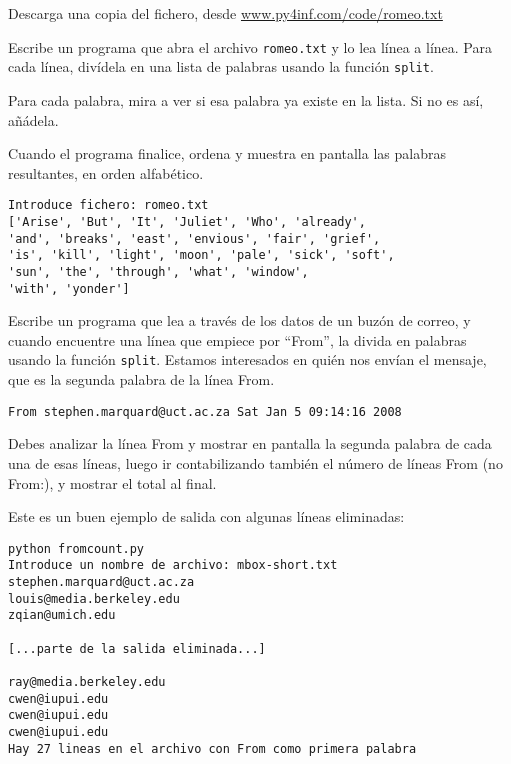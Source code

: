 \begin{ex}
Descarga una copia del fichero, desde
\url{www.py4inf.com/code/romeo.txt}

Escribe un programa que abra el archivo {\tt romeo.txt} y lo lea
línea a línea. Para cada línea, divídela en una lista de
palabras usando la función {\tt split}.

Para cada palabra, mira a ver si esa palabra ya existe en la lista.
Si no es así, añádela.

Cuando el programa finalice, ordena y muestra en pantalla las
palabras resultantes, en orden alfabético.

\begin{verbatim}
Introduce fichero: romeo.txt
['Arise', 'But', 'It', 'Juliet', 'Who', 'already', 
'and', 'breaks', 'east', 'envious', 'fair', 'grief', 
'is', 'kill', 'light', 'moon', 'pale', 'sick', 'soft', 
'sun', 'the', 'through', 'what', 'window', 
'with', 'yonder']
\end{verbatim}
\end{ex}

\begin{ex}
Escribe un programa que lea a través de los datos de un buzón de correo, y cuando
encuentre una línea que empiece por ``From'', la divida en
palabras usando la función {\tt split}. Estamos interesados en
quién nos envían el mensaje, que es la segunda palabra de la línea From.

{\tt From stephen.marquard@uct.ac.za Sat Jan  5 09:14:16 2008 }

Debes analizar la línea From y mostrar en pantalla la segunda palabra de
cada una de esas líneas, luego ir contabilizando también el número de líneas From
(no From:), y mostrar el total al final.

Este es un buen ejemplo de salida con algunas líneas eliminadas:

\beforeverb
\begin{verbatim}
python fromcount.py 
Introduce un nombre de archivo: mbox-short.txt
stephen.marquard@uct.ac.za
louis@media.berkeley.edu
zqian@umich.edu

[...parte de la salida eliminada...]

ray@media.berkeley.edu
cwen@iupui.edu
cwen@iupui.edu
cwen@iupui.edu
Hay 27 lineas en el archivo con From como primera palabra
\end{verbatim}
\afterverb
%
\end{ex}

